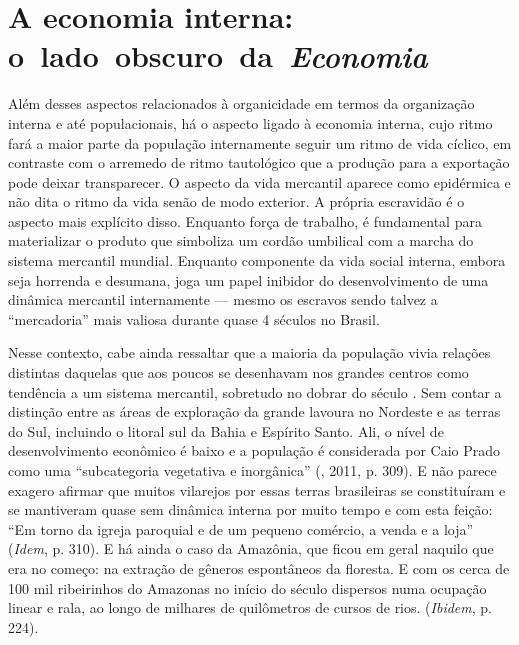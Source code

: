 \section{A economia interna: o~lado~obscuro~da~\emph{Economia}}

Além desses aspectos relacionados à organicidade em termos da
organização interna e até populacionais, há o aspecto ligado à economia
interna, cujo ritmo fará a maior parte da população internamente seguir
um ritmo de vida cíclico, em contraste com o arremedo de ritmo
tautológico que a produção para a exportação pode deixar transparecer. O
aspecto da vida mercantil aparece como epidérmica e não dita o ritmo da
vida senão de modo exterior. A própria escravidão é o aspecto mais
explícito disso. Enquanto força de trabalho, é fundamental para
materializar o produto que simboliza um cordão umbilical com a marcha do
sistema mercantil mundial. Enquanto componente da vida social interna,
embora seja horrenda e desumana, joga um papel inibidor do
desenvolvimento de uma dinâmica mercantil internamente --- mesmo os
escravos sendo talvez a ``mercadoria'' mais valiosa durante quase 4
séculos no Brasil.

Nesse contexto, cabe ainda ressaltar que a maioria da população vivia
relações distintas daquelas que aos poucos se desenhavam nos grandes
centros como tendência a um sistema mercantil, sobretudo no dobrar do
século . Sem contar a distinção entre as áreas de exploração da
grande lavoura no Nordeste e as terras do Sul, incluindo o litoral sul
da Bahia e Espírito Santo. Ali, o nível de desenvolvimento econômico é
baixo e a população é considerada por Caio Prado como uma ``subcategoria
vegetativa e inorgânica'' (, 2011, p. 309). E não parece exagero
afirmar que muitos vilarejos por essas terras brasileiras se
constituíram e se mantiveram quase sem dinâmica interna por muito tempo
e com esta feição: ``Em torno da igreja paroquial e de um pequeno
comércio, a venda e a loja'' (\emph{Idem}, p. 310). E há ainda o caso
da Amazônia, que ficou em geral naquilo que era no começo: na extração
de gêneros espontâneos da floresta. E com os cerca de 100 mil
ribeirinhos do Amazonas no início do século  dispersos numa ocupação
linear e rala, ao longo de milhares de quilômetros de cursos de rios.
(\emph{Ibidem}, p. 224).


